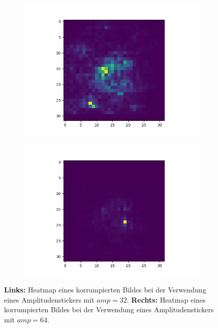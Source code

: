 \documentclass[11pt,a4paper]{article}
\numberwithin{equation}{section}
\begin{document}
	\begin{figure}
		\centering
		\begin{subfigure}{.5\textwidth}
			\centering
			\includegraphics[width=.7\linewidth]{140_poison_CLPA_1sticker_amp32n5d10e-rule_heatmap.png}
			
		\end{subfigure}%
		\begin{subfigure}{.5\textwidth}
			\centering
			\includegraphics[width=.7\linewidth]{140_poison_CLPA_1sticker_amp64n5d10e-rule_heatmap.png}
			
		\end{subfigure}
		\caption[Vergleich zweier Heatmaps mit Amplitudenstickern.]{\textbf{Links:} Heatmap eines korrumpierten Bildes bei der Verwendung eines Amplitudenstickers mit $amp=32$.  \textbf{Rechts:} Heatmap eines korrumpierten Bildes bei der Verwendung eines Amplitudenstickers mit $amp=64$.}
		
		
		\label{fig:vergleich_heatmaps_red_Amplituden}
	\end{figure}
	
\end{document}
